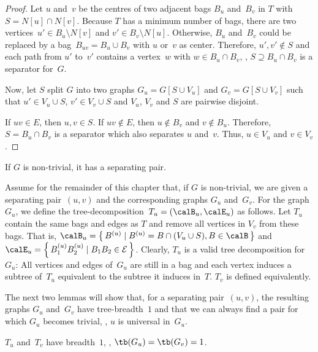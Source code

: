 \begin{proof}
Let $u$ and~$v$ be the centres of two adjacent bags $B_u$ and~$B_v$ in $T$ with $S = N[u] \cap N[v]$.
Because $T$ has a minimum number of bags, there are two vertices~$u' \in B_u \setminus N[v]$ and $v' \in B_v \setminus N[u]$.
Otherwise, $B_u$ and~$B_v$ could be replaced by a bag~$B_{uv} = B_u \cup B_v$ with $u$ or~$v$ as center.
Therefore, $u', v' \notin S$ and each path from $u'$ to~$v'$ contains a vertex~$w$ with $w \in B_u \cap B_v$, \ie, $S \supseteq B_u \cap B_v$ is a separator for~$G$.

Now, let $S$ split $G$ into two graphs $G_u = G[S \cup V_u]$ and $G_v = G[S \cup V_v]$ such that $u' \in V_u \cup S$, $v' \in V_v \cup S$ and $V_u$, $V_v$ and $S$ are pairwise disjoint.

If $uv \in E$, then $u, v \in S$.
If $uv \notin E$, then $u \notin B_v$ and $v \notin B_u$.
Therefore, $S = B_u \cap B_v$ is a separator which also separates $u$ and~$v$.
Thus, $u \in V_u$ and $v \in V_v$.
\end{proof}

\begin{corollary}
    \label{cor:AlwaysSeparatingPair}
If \( G \) is non-trivial, it has a separating pair.
\end{corollary}

Assume for the remainder of this chapter that, if $G$ is non-trivial, we are given a separating pair~$(u,v)$ and the corresponding graphs $G_u$ and~$G_v$.
For the graph~$G_u$, we define the tree-decomposition~$T_u = (\calB_u, \calE_u)$ as follows.
Let $T_u$ contain the same bags and edges as $T$ and remove all vertices in $V_v$ from these bags.
That is, $\calB_u = \left \{ \, B^{(u)} \mid B^{(u)} = B \cap (V_u \cup S), B \in \calB \, \right \}$ and $\calE_u = \left \{ \, B^{(u)}_1B^{(u)}_2 \mid B_1B_2 \in \cal E \, \right \}$.
Clearly, $T_u$ is a valid tree decomposition for~$G_u$:
All vertices and edges of~$G_u$ are still in a bag and each vertex induces a subtree of~$T_u$ equivalent to the subtree it induces in~$T$.
$T_v$ is defined equivalently.

The next two lemmas will show that, for a separating pair~$(u, v)$, the resulting graphs $G_u$ and~$G_v$ have tree-breadth~$1$ and that we can always find a pair for which $G_u$ becomes trivial, \ie, $u$ is universal in~$G_u$.

\begin{lemma}
    \label{lem:splitInTwoTb1}
\( T_u \) and~\( T_v \) have breadth~\( 1 \), \ie, \( \tb(G_u) = \tb(G_v) = 1 \).
\end{lemma}

